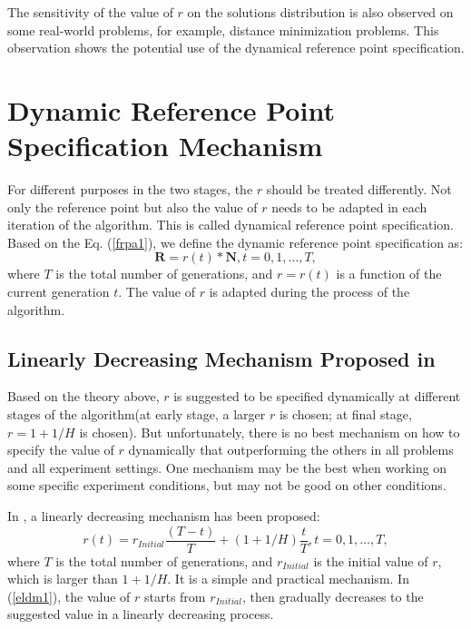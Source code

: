 \documentclass[conference]{IEEEtran}
\begin{document}
The sensitivity of the value of $r$ on the solutions distribution is also observed on some real-world problems,
for example, distance minimization problems. 
This observation shows the potential use of the dynamical reference point specification\cite{hisao:dynamic}.

\section{Dynamic Reference Point Specification Mechanism}
For different purposes in the two stages, the $r$ should be treated differently\cite{hisao:dynamic}. 
Not only the reference point but also the value of $r$ 
needs to be adapted in each iteration of the algorithm. 
This is called dynamical reference point specification. 
Based on the Eq. (\ref{frpa1}), 
we define the dynamic reference point specification as:
\begin{equation}\label{f2}
  \boldsymbol R = r(t) * \boldsymbol N, 
  t=0,1,\dots,T,
\end{equation}
where $T$ is the total number of generations, and $r=r(t)$ is a function of the current generation $t$.
The value of $r$ is adapted during the process of the algorithm. 

% 
\subsection{Linearly Decreasing Mechanism Proposed in \cite{hisao:dynamic}} 
Based on the theory above, $r$ is suggested to be specified dynamically at different stages of
the algorithm(at early stage, a larger $r$ is chosen; at final stage, $r=1+1/H$ is chosen).
But unfortunately, there is no best mechanism on how to specify the value of $r$ dynamically
that outperforming the others in all problems and all experiment settings. One mechanism may be the best
when working on some specific experiment conditions, but may not be good on other conditions. 

In \cite{hisao:dynamic}, a linearly decreasing mechanism has been proposed:
\begin{equation}\label{eldm1}
  r(t)=r_{Initial}\frac{(T-t)}{T}+(1+1/H)\frac{t}{T}, t=0,1,\dots,T,
\end{equation}
where $T$ is the total number of generations, and $r_{Initial}$ is the initial value of $r$,
which is larger than $1+1/H$. 
It is a simple and practical mechanism. In (\ref{eldm1}), the value of $r$ starts from $r_{Initial}$,
then gradually decreases to the suggested value in a linearly decreasing process. 
\end{document}
